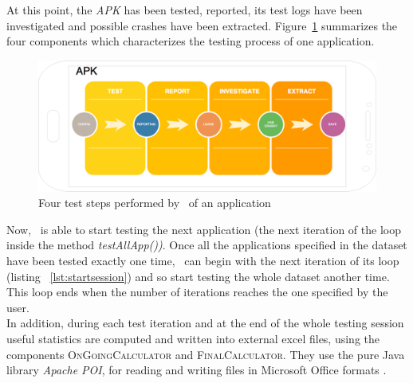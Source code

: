 At this point, the \textit{APK} has been tested, reported, its test logs have been investigated and possible crashes have been extracted. Figure~\ref{fig: apkprocess} summarizes the four components which characterizes the testing process of one application. 
\begin{figure}[htb]
\centering 
\includegraphics[width=\columnwidth]{imgs/apkprocess} 
\caption{Four test steps performed by \toolname\ of an application}
\label{fig: apkprocess}
\end{figure}



Now, \toolname\ is able to start testing the next application (\ie the next iteration of the loop inside the method \textit{testAllApp())}. 
Once all the applications specified in the dataset have been tested exactly one time, \SessionLauncher\ can begin with the next iteration of its loop (listing ~\ref{lst:startsession}) and so start testing the whole dataset another time. 
This loop ends when the number of iterations reaches the one specified by the user. \\
In addition, during each test iteration and at the end of the whole testing session useful statistics are computed and written into external excel files, using the components \textsc{OnGoingCalculator} and \textsc{FinalCalculator}. They use the pure Java library \textit{Apache POI}, for reading and writing files in Microsoft Office formats \cite{apachepoi}. 




